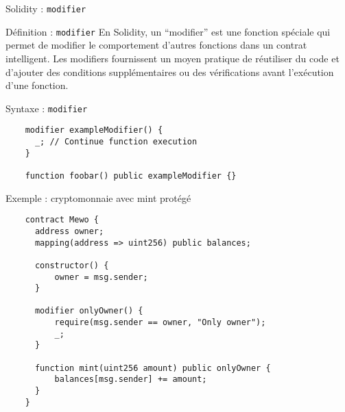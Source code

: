 \begin{frame}[fragile]{Solidity : \texttt{modifier}}
  \begin{block}{Définition : \texttt{modifier}}
    En Solidity, un \enquote{modifier} est une fonction spéciale qui permet de modifier le comportement d'autres fonctions dans un contrat intelligent.
    Les modifiers fournissent un moyen pratique de réutiliser du code et d'ajouter des conditions supplémentaires ou des vérifications avant l'exécution d'une fonction.
  \end{block}


  \begin{block}{Syntaxe : \texttt{modifier}}
    \begin{verbatim}
    modifier exampleModifier() {
      _; // Continue function execution
    }

    function foobar() public exampleModifier {}
  \end{verbatim}
  \end{block}
\end{frame}

\begin{frame}[fragile]{Exemple : cryptomonnaie avec mint protégé}
  \begin{verbatim}
    contract Mewo {
      address owner;
      mapping(address => uint256) public balances;

      constructor() {
          owner = msg.sender;
      }
    
      modifier onlyOwner() {
          require(msg.sender == owner, "Only owner");
          _;
      }
    
      function mint(uint256 amount) public onlyOwner {
          balances[msg.sender] += amount;
      }
    }
  \end{verbatim}
\end{frame}

